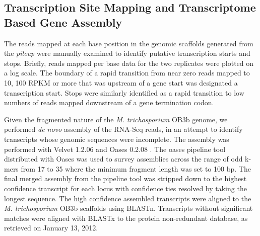 \subsection{Transcription Site Mapping and Transcriptome Based Gene Assembly}
The reads mapped at each base position in the genomic scaffolds generated from the \textit{pileup} were manually examined to identify putative transcription starts and stops.
Briefly, reads mapped per base data for the two replicates were plotted on a log scale.
The boundary of a rapid transition from near zero reads mapped to 10, 100 RPKM or more that was upstream of a gene start was designated a transcription start.
Stops were similarly identified as a rapid transition to low numbers of reads mapped downstream of a gene termination codon.

Given the fragmented nature of the \textit{M. trichosporium} OB3b genome, we performed \textit{de novo} assembly of the RNA-Seq reads, in an attempt to identify transcripts whose genomic sequences were incomplete.
The assembly was performed with Velvet 1.2.06 \cite{zerbino2008} and Oases 0.2.08 \cite{schulz2012}.
The oases pipeline tool distributed with Oases was used to survey assemblies across the range of odd k-mers from 17 to 35 where the minimum fragment length was set to 100 bp.
The final merged assembly from the pipeline tool was stripped down to the highest confidence transcript for each locus with confidence ties resolved by taking the longest sequence.
The high confidence assembled transcripts were aligned to the \textit{M. trichosporium} OB3b scaffolds using BLASTn.
Transcripts without significant matches were aligned with BLASTx to the protein non-redundant database, as retrieved on January 13, 2012.


